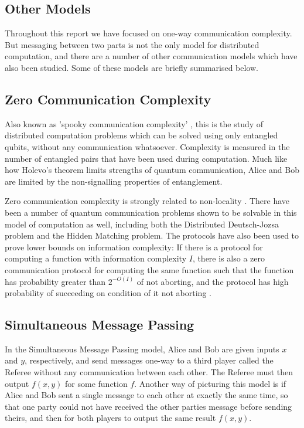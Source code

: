 \documentclass[a4paper]{article}
\begin{document}
\begin{appendices}
    \section{Other Models}
    \label{sec:other-models}

        Throughout this report we have focused on one-way communication complexity. But messaging between two parts is not the only model for distributed computation, and there are a number of other communication models which have also been studied. Some of these models are briefly summarised below.

        \subsection{Zero Communication Complexity}

        Also known as 'spooky communication complexity' \cite{quant-ph/0101005}, this is the study of distributed computation problems which can be solved using only entangled qubits, without any communication whatsoever. Complexity is measured in the number of entangled pairs that have been used during computation. Much like how Holevo's theorem limits strengths of quantum communication, Alice and Bob are limited by the non-signalling properties of entanglement.

        Zero communication complexity is strongly related to non-locality \cite{RevModPhys.82.665}. There have been a number of quantum communication problems shown to be solvable in this model of computation as well, including both the Distributed Deutsch-Jozsa problem and the Hidden Matching problem. The protocols have also been used to prove lower bounds on information complexity: If there is a protocol for computing a function with information complexity $I$, there is also a zero communication protocol for computing the same function such that the function has probability greater than $2^{-O(I)}$ of not aborting, and the protocol has high probability of succeeding on condition of it not aborting \cite{Kerenidis:2012:LBI:2417500.2417819}.

        \subsection{Simultaneous Message Passing}

        In the Simultaneous Message Passing model, Alice and Bob are given inputs $x$ and $y$, respectively, and send messages one-way to a third player called the Referee without any communication between each other. The Referee must then output $f(x, y)$ for some function $f$. Another way of picturing this model is if Alice and Bob sent a single message to each other at exactly the same time, so that one party could not have received the other parties message before sending theirs, and then for both players to output the same result $f(x, y)$.


\end{appendices}
\end{document}
